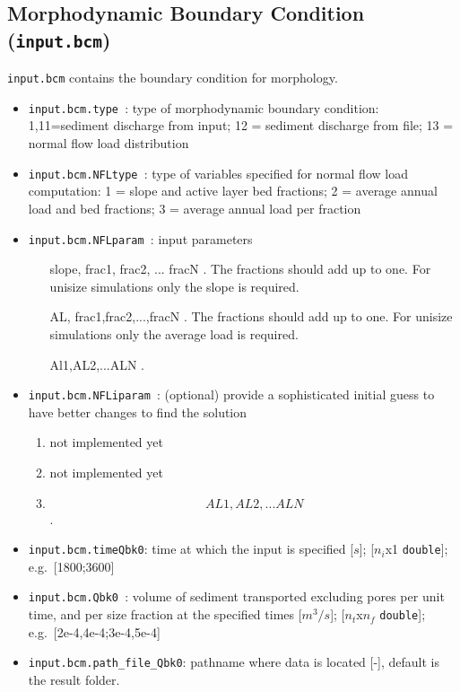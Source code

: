 \documentclass[a4paper, 11pt]{article}
\begin{document}
\subsection{Morphodynamic Boundary Condition (\texttt{input.bcm})}
\label{subsubsec:in_bcm}
%
\texttt{input.bcm} contains the boundary condition for morphology.
\begin{itemize}
\item \texttt{input.bcm.type    }: type of morphodynamic boundary condition: {1,11}=sediment discharge from input; 12 = sediment discharge from file; 13 = normal flow load distribution
\item \texttt{input.bcm.NFLtype }: type of variables specified for normal flow load computation: 1 = slope and active layer bed fractions; 2 = average annual load and bed fractions; 3 = average annual load per fraction 
\item \texttt{input.bcm.NFLparam   }: input parameters
\begin{enumerate}
\item [slope, frac1, frac2, ... fracN]. The fractions should add up to one. For unisize simulations only the slope is required.
\item [AL, frac1,frac2,...,fracN]. The fractions should add up to one. For unisize simulations only the average load is required.
\item [Al1,AL2,...ALN].
\end{enumerate}
\item \texttt{input.bcm.NFLiparam   }: (optional) provide a sophisticated initial guess to have better changes to find the solution
\begin{enumerate}
\item not implemented yet
\item not implemented yet
\item \[AL1,AL2,...ALN \].
\end{enumerate}
\item \texttt{input.bcm.timeQbk0}: time at which the input is specified [$s$]; [$n_i$x1 \texttt{double}]; e.g.\ [1800;3600]
\item \texttt{input.bcm.Qbk0    }: volume of sediment transported excluding pores per unit time, and per size fraction at the specified times [$m^3/s$]; [$n_t$x$n_f$ \texttt{double}]; e.g.\ [2e-4,4e-4;3e-4,5e-4]
\item \texttt{input.bcm.path\_file\_Qbk0}: pathname where data is located [-], default is the result folder.
\end{itemize}
\end{document}
